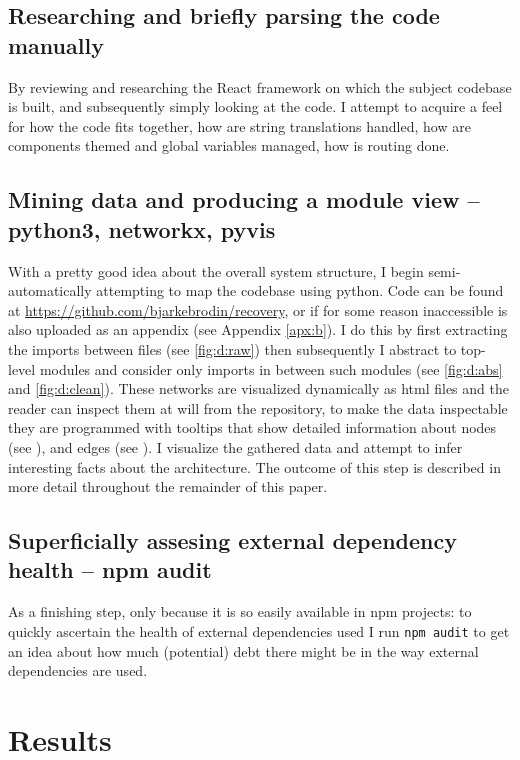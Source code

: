 \documentclass{article}
\begin{document}
\subsection{Researching and briefly parsing the code manually}

By reviewing and researching the React framework on which the subject codebase is built,
and subsequently simply looking at the code. 
I attempt to acquire a feel for how the code fits together,
how are string translations handled,
how are components themed and global variables managed,
how is routing done.

\subsection{Mining data and producing a module view -- python3, networkx, pyvis}

With a pretty good idea about the overall system structure,
I begin semi-automatically attempting to map the codebase using python.
Code can be found at \href{https://github.com/bjarkebrodin/recovery}{https://github.com/bjarkebrodin/recovery},
or if for some reason inaccessible is also uploaded as an appendix (see Appendix \ref{apx:b}).
I do this by first extracting the imports between files (see \ref{fig:d:raw})
then subsequently I abstract to top-level modules and consider only imports in between such modules (see \ref{fig:d:abs} and \ref{fig:d:clean}).
These networks are visualized dynamically as html files and the reader can inspect them at will from the repository,
to make the data inspectable they are programmed with tooltips that show detailed information about nodes (see ), and edges (see ).
I visualize the gathered data and attempt to infer interesting facts about the architecture.
The outcome of this step is described in more detail throughout the remainder of this paper.

\subsection{Superficially assesing external dependency health -- npm audit}

As a finishing step, only because it is so easily available in npm projects:
to quickly ascertain the health of external dependencies used I run \verb|npm audit|
to get an idea about how much (potential) debt there might be in the way external dependencies are used.



\section{Results}
\end{document}
